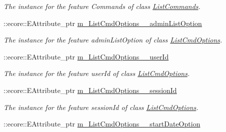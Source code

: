 \begin{DoxyCompactItemize}
\begin{DoxyCompactList}\small\item\em The instance for the feature Commands of class \hyperlink{classUMS__Data_1_1ListCommands}{ListCommands}. \item\end{DoxyCompactList}\item 
\hypertarget{classUMS__Data_1_1UMS__DataPackage_a33ce4807b539e36f4b8609aea4330043}{
::ecore::EAttribute\_\-ptr \hyperlink{classUMS__Data_1_1UMS__DataPackage_a33ce4807b539e36f4b8609aea4330043}{m\_\-ListCmdOptions\_\-\_\-adminListOption}}
\label{classUMS__Data_1_1UMS__DataPackage_a33ce4807b539e36f4b8609aea4330043}

\begin{DoxyCompactList}\small\item\em The instance for the feature adminListOption of class \hyperlink{classUMS__Data_1_1ListCmdOptions}{ListCmdOptions}. \item\end{DoxyCompactList}\item 
\hypertarget{classUMS__Data_1_1UMS__DataPackage_a2b67d383b8ff44f37145b75a9b3264b0}{
::ecore::EAttribute\_\-ptr \hyperlink{classUMS__Data_1_1UMS__DataPackage_a2b67d383b8ff44f37145b75a9b3264b0}{m\_\-ListCmdOptions\_\-\_\-userId}}
\label{classUMS__Data_1_1UMS__DataPackage_a2b67d383b8ff44f37145b75a9b3264b0}

\begin{DoxyCompactList}\small\item\em The instance for the feature userId of class \hyperlink{classUMS__Data_1_1ListCmdOptions}{ListCmdOptions}. \item\end{DoxyCompactList}\item 
\hypertarget{classUMS__Data_1_1UMS__DataPackage_a857a7afaa97ae4d83c1569c030233574}{
::ecore::EAttribute\_\-ptr \hyperlink{classUMS__Data_1_1UMS__DataPackage_a857a7afaa97ae4d83c1569c030233574}{m\_\-ListCmdOptions\_\-\_\-sessionId}}
\label{classUMS__Data_1_1UMS__DataPackage_a857a7afaa97ae4d83c1569c030233574}

\begin{DoxyCompactList}\small\item\em The instance for the feature sessionId of class \hyperlink{classUMS__Data_1_1ListCmdOptions}{ListCmdOptions}. \item\end{DoxyCompactList}\item 
\hypertarget{classUMS__Data_1_1UMS__DataPackage_afd994b27393010ce79d3acaae31b9557}{
::ecore::EAttribute\_\-ptr \hyperlink{classUMS__Data_1_1UMS__DataPackage_afd994b27393010ce79d3acaae31b9557}{m\_\-ListCmdOptions\_\-\_\-startDateOption}}
\label{classUMS__Data_1_1UMS__DataPackage_afd994b27393010ce79d3acaae31b9557}


\end{DoxyCompactItemize}
